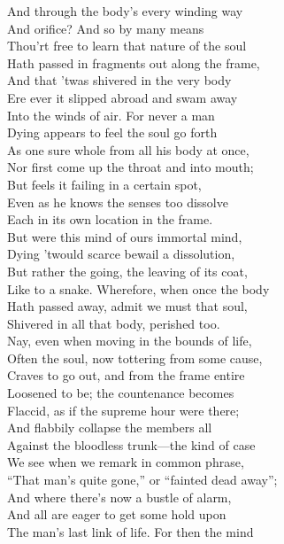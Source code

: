 And through the body's every winding way\\
And orifice? And so by many means\\
Thou'rt free to learn that nature of the soul\\
Hath passed in fragments out along the frame,\\
And that 'twas shivered in the very body\\
Ere ever it slipped abroad and swam away\\
Into the winds of air. For never a man\\
Dying appears to feel the soul go forth\\
As one sure whole from all his body at once,\\
Nor first come up the throat and into mouth;\\
But feels it failing in a certain spot,\\
Even as he knows the senses too dissolve\\
Each in its own location in the frame.\\
But were this mind of ours immortal mind,\\
Dying 'twould scarce bewail a dissolution,\\
But rather the going, the leaving of its coat,\\
Like to a snake. Wherefore, when once the body\\
Hath passed away, admit we must that soul,\\
Shivered in all that body, perished too.\\
Nay, even when moving in the bounds of life,\\
Often the soul, now tottering from some cause,\\
Craves to go out, and from the frame entire\\
Loosened to be; the countenance becomes\\
Flaccid, as if the supreme hour were there;\\
And flabbily collapse the members all\\
Against the bloodless trunk—the kind of case\\
We see when we remark in common phrase,\\
``That man's quite gone,'' or ``fainted dead away'';\\
And where there's now a bustle of alarm,\\
And all are eager to get some hold upon\\
The man's last link of life. For then the mind\\
